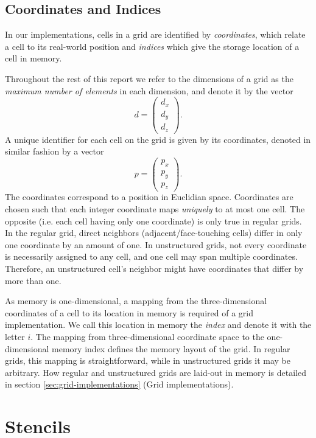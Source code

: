 \subsection{Coordinates and Indices}

In our implementations, cells in a grid are identified by \emph{coordinates}, which relate a cell to its real-world position and \emph{indices} which give the storage location of a cell in memory. 

Throughout the rest of this report we refer to the dimensions of a grid as the \emph{maximum number of elements} in each dimension, and denote it by the vector
$$d = \begin{pmatrix}d_x \\ d_y \\ d_z\end{pmatrix}.$$
A unique identifier for each cell on the grid is given by its coordinates, denoted in similar fashion by a vector
$$p = \begin{pmatrix}p_x \\ p_y \\ p_z\end{pmatrix}.$$
The coordinates correspond to a position in Euclidian space. Coordinates are chosen such that each integer coordinate maps \emph{uniquely} to at most one cell. The opposite (i.e. each cell having only one coordinate) is only true in regular grids. In the regular grid, direct neighbors (adjacent/face-touching cells) differ in only one coordinate by an amount of one. In unstructured grids, not every coordinate is necessarily assigned to any cell, and one cell may span multiple coordinates. Therefore, an unstructured cell's neighbor might have coordinates that differ by more than one.

As memory is one-dimensional, a mapping from the three-dimensional coordinates of a cell to its location in memory is required of a grid implementation. We call this location in memory the \emph{index} and denote it with the letter $i$. The mapping from three-dimensional coordinate space to the one-dimensional memory index defines the memory layout of the grid. In regular grids, this mapping is straightforward, while in unstructured grids it may be arbitrary. How regular and unstructured grids are laid-out in memory is detailed in section \ref{sec:grid-implementations} (Grid implementations).

\section{Stencils}									\label{sec:stencils}

